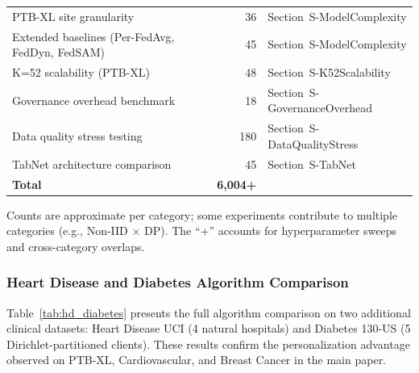 \documentclass[conference]{IEEEtran}
\begin{document}
\begin{table}[htbp]
\begin{tabular}{lrl}
PTB-XL site granularity & 36 & Section~S-ModelComplexity \\
Extended baselines (Per-FedAvg, FedDyn, FedSAM) & 45 & Section~S-ModelComplexity \\
K=52 scalability (PTB-XL) & 48 & Section~S-K52Scalability \\
Governance overhead benchmark & 18 & Section~S-GovernanceOverhead \\
Data quality stress testing & 180 & Section~S-DataQualityStress \\
TabNet architecture comparison & 45 & Section~S-TabNet \\
\midrule
\textbf{Total} & \textbf{6,004+} & \\
\bottomrule
\end{tabular}
\par{\footnotesize Counts are approximate per category; some experiments contribute to multiple categories (e.g., Non-IID $\times$ DP). The ``+'' accounts for hyperparameter sweeps and cross-category overlaps.}
\end{table}

\subsubsection{Heart Disease and Diabetes Algorithm Comparison}

Table~\ref{tab:hd_diabetes} presents the full algorithm comparison on two additional clinical datasets: Heart Disease UCI (4 natural hospitals) and Diabetes 130-US (5 Dirichlet-partitioned clients). These results confirm the personalization advantage observed on PTB-XL, Cardiovascular, and Breast Cancer in the main paper.
\end{document}
